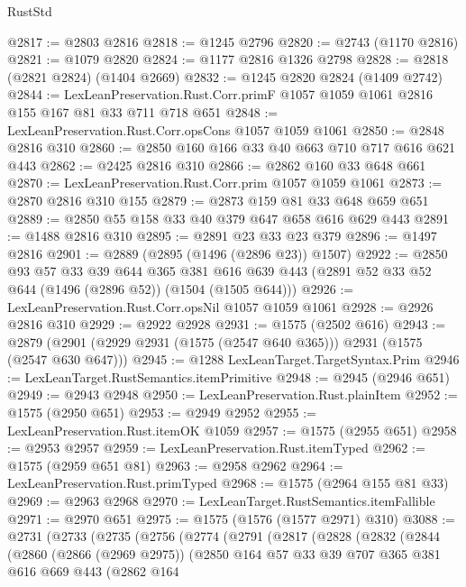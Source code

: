 \begin{lexlean}{RustStd}
\begin{coremodule}
@2817 := @2803 @2816
@2818 := @1245 @2796
@2820 := @2743 (@1170 @2816)
@2821 := @1079 @2820
@2824 := @1177 @2816 @1326 @2798
@2828 := @2818 (@2821 @2824) (@1404 @2669)
@2832 := @1245 @2820 @2824 (@1409 @2742)
@2844 := LexLeanPreservation.Rust.Corr.primF
    @1057
    @1059
    @1061
    @2816
    @155
    @167
    @81
    @33
    @711
    @718
    @651
@2848 := LexLeanPreservation.Rust.Corr.opsCons @1057 @1059 @1061
@2850 := @2848 @2816 @310
@2860 := @2850 @160 @166 @33 @40 @663 @710 @717 @616 @621 @443
@2862 := @2425 @2816 @310
@2866 := @2862 @160 @33 @648 @661
@2870 := LexLeanPreservation.Rust.Corr.prim @1057 @1059 @1061
@2873 := @2870 @2816 @310 @155
@2879 := @2873 @159 @81 @33 @648 @659 @651
@2889 := @2850 @55 @158 @33 @40 @379 @647 @658 @616 @629 @443
@2891 := @1488 @2816 @310
@2895 := @2891 @23 @33 @23 @379
@2896 := @1497 @2816
@2901 := @2889 (@2895 (@1496 (@2896 @23)) @1507)
@2922 := @2850
    @93
    @57
    @33
    @39
    @644
    @365
    @381
    @616
    @639
    @443
    (@2891 @52 @33 @52 @644 (@1496 (@2896 @52)) (@1504 (@1505 @644)))
@2926 := LexLeanPreservation.Rust.Corr.opsNil @1057 @1059 @1061
@2928 := @2926 @2816 @310
@2929 := @2922 @2928
@2931 := @1575 (@2502 @616)
@2943 := @2879 (@2901 (@2929 @2931 (@1575 (@2547 @640 @365))) @2931 (@1575 (@2547 @630 @647)))
@2945 := @1288 LexLeanTarget.TargetSyntax.Prim
@2946 := LexLeanTarget.RustSemantics.itemPrimitive
@2948 := @2945 (@2946 @651)
@2949 := @2943 @2948
@2950 := LexLeanPreservation.Rust.plainItem
@2952 := @1575 (@2950 @651)
@2953 := @2949 @2952
@2955 := LexLeanPreservation.Rust.itemOK @1059
@2957 := @1575 (@2955 @651)
@2958 := @2953 @2957
@2959 := LexLeanPreservation.Rust.itemTyped
@2962 := @1575 (@2959 @651 @81)
@2963 := @2958 @2962
@2964 := LexLeanPreservation.Rust.primTyped
@2968 := @1575 (@2964 @155 @81 @33)
@2969 := @2963 @2968
@2970 := LexLeanTarget.RustSemantics.itemFallible
@2971 := @2970 @651
@2975 := @1575 (@1576 (@1577 @2971) @310)
@3088 := @2731
    (@2733
      (@2735
        (@2756
          (@2774
            (@2791
              (@2817
                (@2828
                  (@2832
                    (@2844
                      (@2860
                        (@2866 (@2969 @2975))
                        (@2850
                          @164
                          @57
                          @33
                          @39
                          @707
                          @365
                          @381
                          @616
                          @669
                          @443
                          (@2862
                            @164

\end{coremodule}
\end{lexlean}
